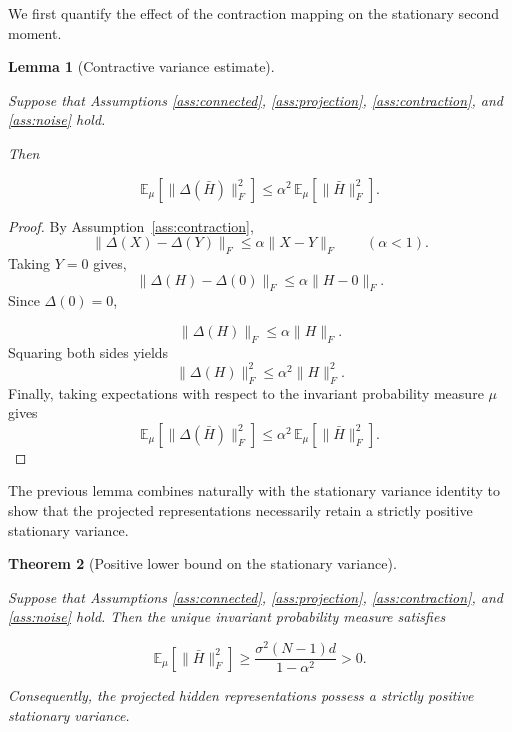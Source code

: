 \documentclass{article}
\newtheorem{theorem}{Theorem}[section]
\newtheorem{lemma}[theorem]{Lemma}
\begin{document}
We first quantify the effect of the contraction mapping on the stationary
second moment.

\begin{lemma}[Contractive variance estimate]
	\label{lem:variance_contraction}
	
Suppose that Assumptions
\ref{ass:connected},
\ref{ass:projection},
\ref{ass:contraction},
and
\ref{ass:noise}
hold.
	
	Then
	
	\[
	\boxed{
		\mathbb E_\mu
		\!\left[
		\|\Delta(\bar H)\|_F^2
		\right]
		\le
		\alpha^2
		\,
		\mathbb E_\mu
		\!\left[
		\|\bar H\|_F^2
		\right].
	}
	\]
	
\end{lemma}

\begin{proof}
	
	By Assumption~\ref{ass:contraction},
	\[
	\|\Delta(X)-\Delta(Y)\|_F
	\le
	\alpha
	\|X-Y\|_F
	\qquad
	(\alpha<1).
	\]	
	Taking $Y=0$ gives,	
\[
\|
\Delta(H)-\Delta(0)
\|_F
\le
\alpha
\|H-0\|_F.
\]
Since
$\Delta(0)=0$,

\[
\|\Delta(H)\|_F
\le
\alpha
\|H\|_F.
\]
Squaring both sides yields
\[
\|\Delta(H)\|_F^2
\le
\alpha^2
\|H\|_F^2.
\]
Finally, taking expectations with respect to the invariant probability
	measure $\mu$ gives	
	\[
	\mathbb E_\mu
	\!\left[
	\|\Delta(\bar H)\|_F^2
	\right]
	\le
	\alpha^2
	\,
	\mathbb E_\mu
	\!\left[
	\|\bar H\|_F^2
	\right].
	\]
	
\end{proof}

The previous lemma combines naturally with the stationary variance
identity to show that the projected representations necessarily retain a
strictly positive stationary variance.

\begin{theorem}[Positive lower bound on the stationary variance]
	\label{thm:variance_persistence}
	
Suppose that Assumptions
\ref{ass:connected},
\ref{ass:projection},
\ref{ass:contraction},
and
\ref{ass:noise}
hold. Then the unique invariant probability measure satisfies
	
	\[
	\boxed{
		\mathbb E_\mu
		\!\left[
		\|\bar H\|_F^2
		\right]
		\ge
		\frac{\sigma^2 (N-1)d}
		{1-\alpha^2}
		>0.
	}
	\]
	
	Consequently, the projected hidden representations possess a strictly
	positive stationary variance.
	
\end{theorem}
\end{document}
